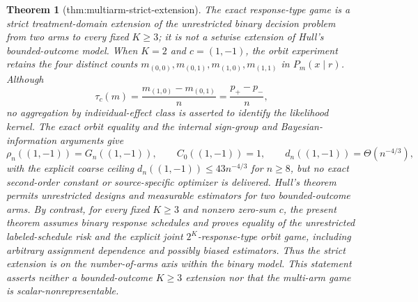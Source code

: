 \documentclass{article}
\newtheorem{theorem}{Theorem}
\begin{document}
\begin{theorem}[thm:multiarm-strict-extension]\label{thm:multiarm-strict-extension}
The exact response-type game is a strict treatment-domain extension of the unrestricted binary decision problem from two arms to every fixed \(K\geq3\); it is not a setwise extension of Hull's bounded-outcome model. When \(K=2\) and \(c=(1,-1)\), the orbit experiment retains the four distinct counts \(m_{(0,0)},m_{(0,1)},m_{(1,0)},m_{(1,1)}\) in \(P_m(x\mid r)\). Although
\[
 \tau_c(m)=\frac{m_{(1,0)}-m_{(0,1)}}n=\frac{p_+-p_-}{n},
\]
no aggregation by individual-effect class is asserted to identify the likelihood kernel. The exact orbit equality and the internal sign-group and Bayesian-information arguments give
\[
 \rho_n((1,-1))=G_n((1,-1)),
 \qquad C_0((1,-1))=1,
 \qquad d_n((1,-1))=\Theta(n^{-4/3}),
\]
with the explicit coarse ceiling \(d_n((1,-1))\leq43n^{-4/3}\) for \(n\geq8\), but no exact second-order constant or source-specific optimizer is delivered. Hull's theorem permits unrestricted designs and measurable estimators for two bounded-outcome arms. By contrast, for every fixed \(K\geq3\) and nonzero zero-sum \(c\), the present theorem assumes binary response schedules and proves equality of the unrestricted labeled-schedule risk and the explicit joint \(2^K\)-response-type orbit game, including arbitrary assignment dependence and possibly biased estimators. Thus the strict extension is on the number-of-arms axis within the binary model. This statement asserts neither a bounded-outcome \(K\geq3\) extension nor that the multi-arm game is scalar-nonrepresentable.
\end{theorem}
\end{document}

